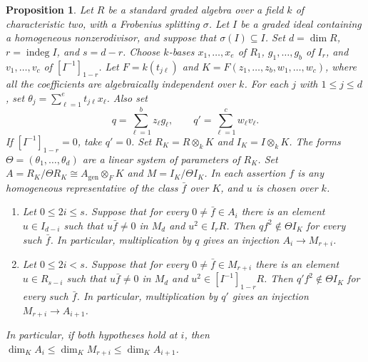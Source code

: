 \documentclass[a4paper,11pt]{amsart}
\DeclareMathOperator{\indeg}{indeg}
\newcommand{\kk}{k}
\newtheorem{proposition}[theorem]{Proposition}
\theoremstyle{definition}
\begin{document}
\begin{proposition}\label{prop:split-injections}
Let $R$ be a standard graded algebra over a field $\kk$ of characteristic two, with a Frobenius splitting $\sigma$. Let $I$ be a graded ideal containing a homogeneous nonzerodivisor, and suppose that $\sigma(I)\subseteq I$. Set $d=\dim R$, $r=\indeg I$, and $s=d-r$. Choose $\kk$-bases $x_1,\ldots,x_e$ of $R_1$, $g_1,\ldots,g_b$ of $I_r$, and $v_1,\ldots,v_c$ of $[I^{-1}]_{1-r}$. Let $F=\kk(t_{j\ell})$ and $K=F(z_1,\ldots,z_b,w_1,\ldots,w_c)$, where all the coefficients are algebraically independent over $\kk$. For each $j$ with $1\leq j\leq d$, set $\theta_j=\sum_{\ell=1}^e t_{j\ell}x_\ell$. Also set
\[
 q=\sum_{\ell=1}^b z_\ell g_\ell,\qquad q'=\sum_{\ell=1}^c w_\ell v_\ell.
\]
If $[I^{-1}]_{1-r}=0$, take $q'=0$. Set $R_K=R\otimes_{\kk}K$ and $I_K=I\otimes_{\kk}K$. The forms $\Theta=(\theta_1,\ldots,\theta_d)$ are a linear system of parameters of $R_K$. Set $A=R_K/\Theta R_K\cong A_{\mathrm{gen}}\otimes_F K$ and $M=I_K/\Theta I_K$. In each assertion $f$ is any homogeneous representative of the class $\bar f$ over $K$, and $u$ is chosen over $\kk$.
\begin{enumerate}
\item Let $0\leq2i\leq s$. Suppose that for every $0\neq\bar f\in A_i$ there is an element $u\in I_{d-i}$ such that $u\bar f\neq0$ in $M_d$ and $u^2\in I_r R$. Then $qf^2\notin\Theta I_K$ for every such $\bar f$. In particular, multiplication by $q$ gives an injection $A_i\longrightarrow M_{r+i}$.
\item Let $0\leq2i<s$. Suppose that for every $0\neq\bar f\in M_{r+i}$ there is an element $u\in R_{s-i}$ such that $u\bar f\neq0$ in $M_d$ and $u^2\in[I^{-1}]_{1-r}R$. Then $q'f^2\notin\Theta I_K$ for every such $\bar f$. In particular, multiplication by $q'$ gives an injection $M_{r+i}\longrightarrow A_{i+1}$.
\end{enumerate}
In particular, if both hypotheses hold at $i$, then $\dim_K A_i\leq\dim_K M_{r+i}\leq\dim_K A_{i+1}$.
\end{proposition}
\end{document}
